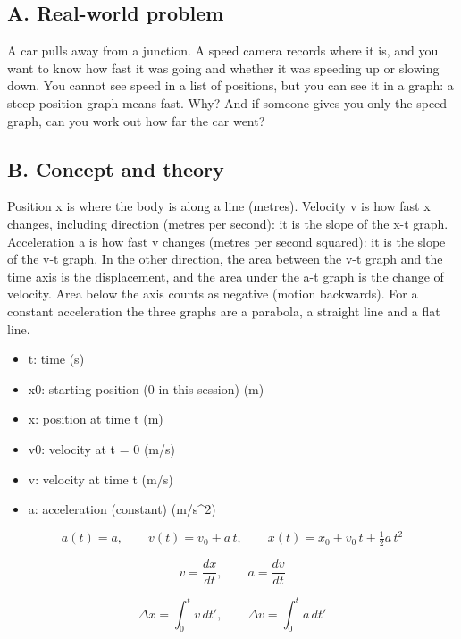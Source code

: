 \documentclass[11pt,a4paper]{article}
\begin{document}
\subsection*{A. Real-world problem}
A car pulls away from a junction. A speed camera records where it is, and you want to know how fast it was going and whether it was speeding up or slowing down. You cannot see speed in a list of positions, but you can see it in a graph: a steep position graph means fast. Why? And if someone gives you only the speed graph, can you work out how far the car went?

\subsection*{B. Concept and theory}
Position x is where the body is along a line (metres). Velocity v is how fast x changes, including direction (metres per second): it is the slope of the x-t graph. Acceleration a is how fast v changes (metres per second squared): it is the slope of the v-t graph. In the other direction, the area between the v-t graph and the time axis is the displacement, and the area under the a-t graph is the change of velocity. Area below the axis counts as negative (motion backwards). For a constant acceleration the three graphs are a parabola, a straight line and a flat line.

\begin{itemize}[nosep]
\item t: time (s)
\item x0: starting position (0 in this session) (m)
\item x: position at time t (m)
\item v0: velocity at t = 0 (m/s)
\item v: velocity at time t (m/s)
\item a: acceleration (constant) (m/s\textasciicircum{}2)
\end{itemize}

\begin{equation*}
a(t)=a,\qquad v(t)=v_0+a\,t,\qquad x(t)=x_0+v_0\,t+\tfrac12 a\,t^2
\end{equation*}

\begin{equation*}
v=\frac{dx}{dt},\qquad a=\frac{dv}{dt}
\end{equation*}

\begin{equation*}
\Delta x=\int_0^t v\,dt',\qquad \Delta v=\int_0^t a\,dt'
\end{equation*}
\end{document}
